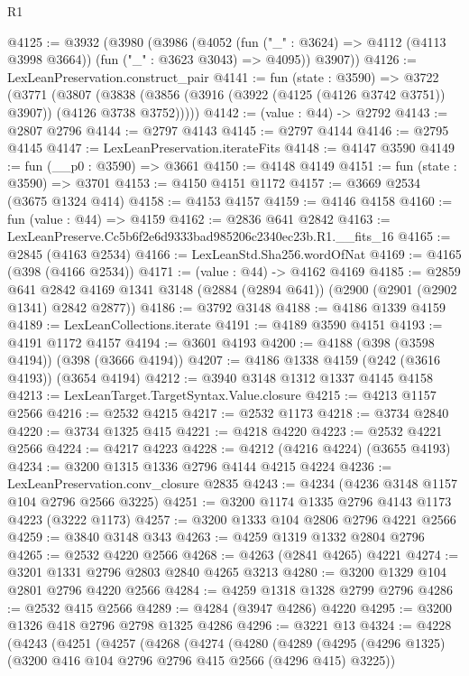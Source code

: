 \begin{lexlean}{R1}
\begin{coremodule}
@4125 := @3932
    (@3980
      (@3986
        (@4052 (fun ("_" : @3624) => @4112 (@4113 @3998 @3664)) (fun ("_" : @3623 @3043) => @4095))
        @3907))
@4126 := LexLeanPreservation.construct_pair
@4141 := fun (state : @3590) =>
  @3722
    (@3771
      (@3807 (@3838 (@3856 (@3916 (@3922 (@4125 (@4126 @3742 @3751)) @3907)) (@4126 @3738 @3752)))))
@4142 := (value : @44) -> @2792
@4143 := @2807 @2796
@4144 := @2797 @4143
@4145 := @2797 @4144
@4146 := @2795 @4145
@4147 := LexLeanPreservation.iterateFits
@4148 := @4147 @3590
@4149 := fun (__p0 : @3590) => @3661
@4150 := @4148 @4149
@4151 := fun (state : @3590) => @3701
@4153 := @4150 @4151 @1172
@4157 := @3669 @2534 (@3675 @1324 @414)
@4158 := @4153 @4157
@4159 := @4146 @4158
@4160 := fun (value : @44) => @4159
@4162 := @2836 @641 @2842
@4163 := LexLeanPreserve.Cc5b6f2e6d9333bad985206c2340ec23b.R1.__fits_16
@4165 := @2845 (@4163 @2534)
@4166 := LexLeanStd.Sha256.wordOfNat
@4169 := @4165 (@398 (@4166 @2534))
@4171 := (value : @44) -> @4162 @4169
@4185 := @2859
    @641
    @2842
    @4169
    @1341
    @3148
    (@2884 (@2894 @641))
    (@2900 (@2901 (@2902 @1341) @2842 @2877))
@4186 := @3792 @3148
@4188 := @4186 @1339 @4159
@4189 := LexLeanCollections.iterate
@4191 := @4189 @3590 @4151
@4193 := @4191 @1172 @4157
@4194 := @3601 @4193
@4200 := @4188 (@398 (@3598 @4194)) (@398 (@3666 @4194))
@4207 := @4186 @1338 @4159 (@242 (@3616 @4193)) (@3654 @4194)
@4212 := @3940 @3148 @1312 @1337 @4145 @4158
@4213 := LexLeanTarget.TargetSyntax.Value.closure
@4215 := @4213 @1157 @2566
@4216 := @2532 @4215
@4217 := @2532 @1173
@4218 := @3734 @2840
@4220 := @3734 @1325 @415
@4221 := @4218 @4220
@4223 := @2532 @4221 @2566
@4224 := @4217 @4223
@4228 := @4212 (@4216 @4224) (@3655 @4193)
@4234 := @3200 @1315 @1336 @2796 @4144 @4215 @4224
@4236 := LexLeanPreservation.conv_closure @2835
@4243 := @4234 (@4236 @3148 @1157 @104 @2796 @2566 @3225)
@4251 := @3200 @1174 @1335 @2796 @4143 @1173 @4223 (@3222 @1173)
@4257 := @3200 @1333 @104 @2806 @2796 @4221 @2566
@4259 := @3840 @3148 @343
@4263 := @4259 @1319 @1332 @2804 @2796
@4265 := @2532 @4220 @2566
@4268 := @4263 (@2841 @4265) @4221
@4274 := @3201 @1331 @2796 @2803 @2840 @4265 @3213
@4280 := @3200 @1329 @104 @2801 @2796 @4220 @2566
@4284 := @4259 @1318 @1328 @2799 @2796
@4286 := @2532 @415 @2566
@4289 := @4284 (@3947 @4286) @4220
@4295 := @3200 @1326 @418 @2796 @2798 @1325 @4286
@4296 := @3221 @13
@4324 := @4228
    (@4243
      (@4251
        (@4257
          (@4268
            (@4274
              (@4280
                (@4289
                  (@4295 (@4296 @1325) (@3200 @416 @104 @2796 @2796 @415 @2566 (@4296 @415) @3225))

\end{coremodule}
\end{lexlean}
